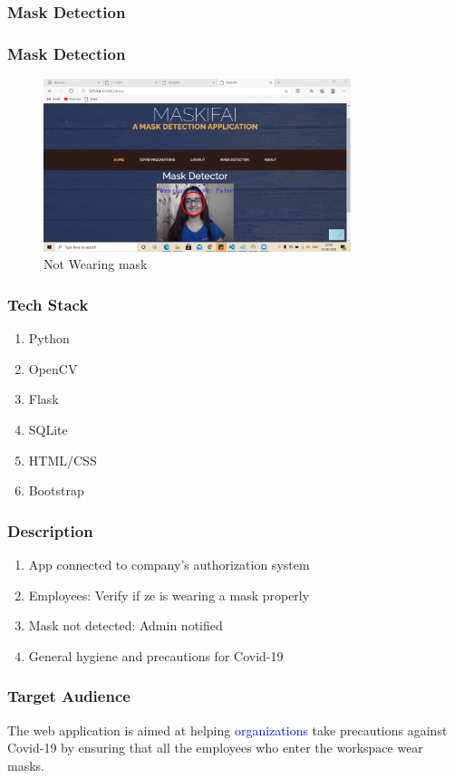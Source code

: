 \documentclass[14pt]{beamer}
\begin{document}
\begin{frame}
    \frametitle{Mask Detection}
    \frametitle{Mask Detection}
    \begin{figure}
    \caption{Not Wearing mask}
    \centering
    \includegraphics[width=0.8\textwidth]{no_mask}
    \end{figure}
\end{frame}

\begin{frame}
    \frametitle{Tech Stack}
    \begin{enumerate}
        \item Python
        \item OpenCV
        \item Flask
        \item SQLite
        \item HTML/CSS
        \item Bootstrap
    \end{enumerate}
\end{frame} 

\begin{frame}
    \frametitle{Description}
    \begin{enumerate}
        \item App connected to company's authorization system
        \item Employees: Verify if ze is wearing a mask properly
        \item Mask not detected: Admin notified
        \item General hygiene and precautions for Covid-19
    \end{enumerate}
\end{frame}


\begin{frame}
    \frametitle{Target Audience}
    The web application is aimed at helping \textcolor{blue}{organizations} take precautions against Covid-19 by ensuring that all the employees who enter the workspace wear masks.
\end{frame}
\end{document}
